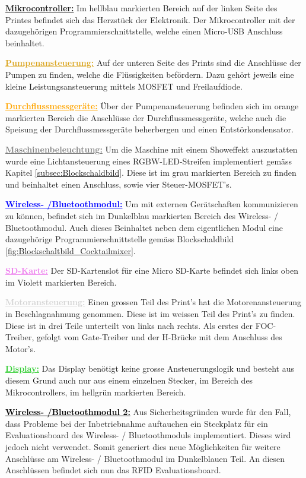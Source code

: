 \textcolor{ProcessBlue}{\textbf{\underline{Mikrocontroller:}}}
Im hellblau markierten Bereich auf der linken Seite des Printes befindet sich das Herzstück der Elektronik. Der Mikrocontroller mit der dazugehörigen Programmierschnittstelle, welche einen Micro-USB Anschluss beinhaltet.

\textcolor{Goldenrod}{\textbf{\underline{Pumpenansteuerung:}}}
Auf der unteren Seite des Prints sind die Anschlüsse der Pumpen zu finden, welche die Flüssigkeiten befördern. Dazu gehört jeweils eine kleine Leistungsansteuerung mittels MOSFET und Freilaufdiode. 

\textcolor{orange}{\textbf{\underline{Durchflussmessgeräte:}}} Über der Pumpenansteuerung befinden sich im orange markierten Bereich die Anschlüsse der Durchflussmessgeräte, welche auch die Speisung der Durchflussmessgeräte beherbergen und einen Entstörkondensator.

\textcolor{gray}{\textbf{\underline{Maschinenbeleuchtung:}}}
Um die Maschine mit einem Showeffekt auszustatten wurde eine Lichtansteuerung eines RGBW-LED-Streifen implementiert gemäss Kapitel \ref{subsec:Blockschaldbild}. Diese ist im grau markierten Bereich zu finden und beinhaltet einen Anschluss, sowie vier Steuer-MOSFET's.

\textcolor{blue}{\textbf{\underline{Wireless- /Bluetoothmodul:}}}
Um mit externen Gerätschaften kommunizieren zu können, befindet sich im Dunkelblau markierten Bereich des Wireless- / Bluetoothmodul. Auch dieses Beinhaltet neben dem eigentlichen Modul eine dazugehörige Programmierschnittstelle gemäss Blockschaldbild \ref{fig:Blockschaltbild_Cocktailmixer}.

\textcolor{violet}{\textbf{\underline{SD-Karte:}}}
Der SD-Kartenslot für eine Micro SD-Karte befindet sich links oben im Violett markierten Bereich.


\textcolor{lightgray}{\textbf{\underline{Motoransteuerung:}}}
Einen grossen Teil des Print's hat die Motorenansteuerung in Beschlagnahmung genommen. Diese ist im weissen Teil des Print's zu finden. Diese ist in drei Teile unterteilt von links nach rechts. Als erstes der FOC-Treiber, gefolgt vom Gate-Treiber und der H-Brücke mit dem Anschluss des Motor's. 

\textcolor{LimeGreen}{\textbf{\underline{Display:}}}
Das Display benötigt keine grosse Ansteuerungslogik und besteht aus diesem Grund auch nur aus einem einzelnen Stecker, im Bereich des Mikrocontrollers, im hellgrün markierten Bereich.

\textcolor{black}{\textbf{\underline{Wireless- /Bluetoothmodul 2:}}}
Aus Sicherheitsgründen wurde für den Fall, dass Probleme bei der Inbetriebnahme auftauchen ein Steckplatz für ein Evaluationsboard des Wireless- / Bluetoothmoduls implementiert. Dieses wird jedoch nicht verwendet. Somit generiert dies neue Möglichkeiten für weitere Anschlüsse am Wireless- / Bluetoothmodul im Dunkelblauen Teil. An diesen Anschlüssen befindet sich nun das RFID Evaluationsboard. 

